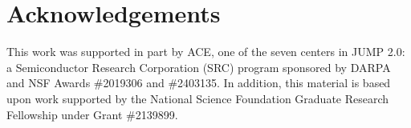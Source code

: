 \section{Acknowledgements}\label{sec:acknowledgements}
This work was supported in part by ACE, one of the seven centers in JUMP 2.0: a
Semiconductor Research Corporation (SRC) program sponsored by DARPA and NSF
Awards \#2019306 and \#2403135. In addition, this material is based upon work
supported by the National Science Foundation Graduate Research Fellowship under
Grant \#2139899.
